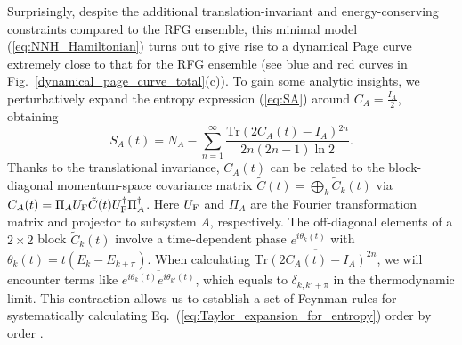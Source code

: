 \documentclass[twocolumn,english,prl,aps,superscriptaddress,amsmath,amssymb,floatfix]{revtex4-2}
\begin{document}
Surprisingly, despite the additional translation-invariant and energy-conserving constraints compared to the RFG ensemble, this minimal model (\ref{eq:NNH_Hamiltonian}) turns out to give rise to %
a dynamical Page curve extremely close to that for the %
RFG ensemble %
(see blue and red curves in Fig.~\ref{dynamical_page_curve_total}(c)). 
To gain some analytic insights, we perturbatively expand %
the entropy expression (\ref{eq:SA}) %
around $C_{A}=\frac{I_{A}}{2}$, obtaining %
\begin{equation}
S_{A}(t)=N_{A}-%
\sum_{n=1}^{\infty}\frac{\mathrm{Tr}(2C_{A}(t)-I_{A}){}^{2n}}{2n(2n-1)\ln2}.
\label{eq:Taylor_expansion_for_entropy}
\end{equation}
Thanks to the translational invariance, $C_{A}(t)$ can be related to the block-diagonal momentum-space covariance matrix $\tilde C(t)=\bigoplus_k\tilde C_k(t)$ via %
$C_{A}(t)=\Pi_{A}U_{\rm F}\tilde{C}(t)U^{\dagger}_{\rm F}\Pi_{A}^{\dagger}$. Here
$U_{\rm F}$ and $\Pi_{A}$ are the Fourier transformation matrix and projector %
to subsystem $A$, respectively. %
The off-diagonal
elements of a $2\times2$ block $\tilde{C}_k(t)$ involve %
a time-dependent %
phase
$e^{i\theta_{k}(t)}$ with %
$\theta_{k}(t)=t(E_{k}-E_{k+\pi})$.
When calculating $\overline{\mathrm{Tr}(2C_{A}(t)-I_{A})^{2n}}$, 
we will encounter %
terms like $\overline{e^{i\theta_{k}(t)}e^{i\theta_{k'}(t)}}$,
which equals to $\delta_{k,k'+\pi}$ in the thermodynamic limit.
This contraction allows us to establish a set of Feynman rules for %
systematically calculating Eq.~(\ref{eq:Taylor_expansion_for_entropy})
order by order \cite{SM}. %
\end{document}
